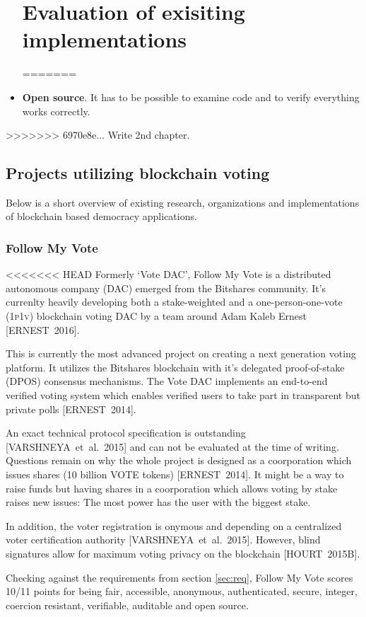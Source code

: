 \documentclass[9pt,oneside]{amsart}
\begin{document}
\begin{multicols}{2}
\begin{itemize}
\section{Evaluation of exisiting implementations}
=======
\item \textbf{Open source}. It has to be possible to examine code and to verify everything works correctly.
\end{itemize}
>>>>>>> 6970e8e... Write 2nd chapter.

\subsection{Projects utilizing blockchain voting}
Below is a short overview of existing research, organizations and implementations of blockchain based democracy applications.


\subsubsection{Follow My Vote}
<<<<<<< HEAD
Formerly \enquote*{Vote DAC}, Follow My Vote is a distributed autonomous company (\textsc{DAC}) emerged from the Bitshares community. It's currenlty heavily developing both a stake-weighted and a one-person-one-vote (\textsc{1p1v}) blockchain voting DAC by a team around Adam Kaleb Ernest [ERNEST~2016].\par
This is currently the most advanced project on creating a next generation voting platform. It utilizes the Bitshares blockchain with it's delegated proof-of-stake (\textsc{DPOS}) consensus mechanisms. The Vote DAC implements an end-to-end verified voting system which enables verified users to take part in transparent but private polls [ERNEST~2014].\par
An exact technical protocol specification is outstanding [VARSHNEYA~et~al.~2015] and can not be evaluated at the time of writing. Questions remain on why the whole project is designed as a coorporation which issues shares (10 billion VOTE tokens) [ERNEST~2014]. It might be a way to raise funds but having shares in a coorporation which allows voting by stake raises new issues: The most power has the user with the biggest stake.\par
In addition, the voter registration is onymous and depending on a centralized voter certification authority [VARSHNEYA~et~al.~2015]. However, blind signatures allow for maximum voting privacy on the blockchain [HOURT~2015B].\par
Checking against the requirements from section \ref{sec:req}, Follow My Vote scores 10/11 points for being fair, accessible, anonymous, authenticated, secure, integer, coercion resistant, verifiable, auditable and open source.


\end{multicols}
\end{document}
